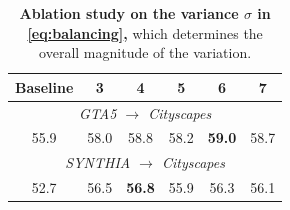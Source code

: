 \begin{table}[t]
\centering
\caption{%
\textbf{Ablation study on various types of variations.} ``None-Variation'' denotes the DAFormer$\dag$ baseline.
%
The green arrows indicate the relative improvement in performance.
}
\label{tab:abla_1}
\vspace{-5pt}
\setlength{\tabcolsep}{22pt}
\vspace{-5pt}
\end{table}


\begin{table}[t]
\centering
\caption{%
%
\textbf{Ablation study on the variance $\sigma$ in \cref{eq:balancing},}
%
which determines the overall magnitude of the variation.
}
\setlength{\tabcolsep}{10pt}
\label{tab:ablation_k}
\vspace{-5pt}
\setlength{\tabcolsep}{9pt}
\begin{tabular}{cccccc}
\toprule
Baseline    &     3& 4 & 5 & 6 & 7   \\
\midrule
\multicolumn{6}{c}{\textit{GTA5 $\to$ Cityscapes}}
\\
55.9  & 58.0 &    58.8   &        58.2   &         \textbf{59.0}   &  58.7          \\
\midrule
\multicolumn{6}{c}{\textit{SYNTHIA $\to$ Cityscapes}} \\
52.7  &56.5  &   \textbf{56.8}    &   55.9        & 56.3           &   56.1         \\
\bottomrule
\end{tabular}
\vspace{-5pt}
\end{table}


